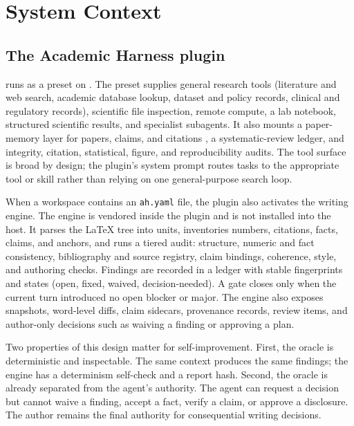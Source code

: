 \section{System Context}
\label{sec:context}

\subsection{The Academic Harness plugin}
\ah{} runs as a preset on \dsh{} \citep{academicharness2026,deepseek2026harness}. The preset supplies general research tools (literature and web search, academic database lookup, dataset and policy records, clinical and regulatory records), scientific file inspection, remote compute, a lab notebook, structured scientific results, and specialist subagents. It also mounts a paper-memory layer for papers, claims, and citations \citep{papermemory2026}, a systematic-review ledger, and integrity, citation, statistical, figure, and reproducibility audits. The tool surface is broad by design; the plugin's system prompt routes tasks to the appropriate tool or skill rather than relying on one general-purpose search loop.

When a workspace contains an \texttt{ah.yaml} file, the plugin also activates the \ah{} writing engine. The engine is vendored inside the plugin and is not installed into the host. It parses the \LaTeX{} tree into units, inventories numbers, citations, facts, claims, and anchors, and runs a tiered audit: structure, numeric and fact consistency, bibliography and source registry, claim bindings, coherence, style, and authoring checks. Findings are recorded in a ledger with stable fingerprints and states (open, fixed, waived, decision-needed). A gate closes only when the current turn introduced no open blocker or major. The engine also exposes snapshots, word-level diffs, claim sidecars, provenance records, review items, and author-only decisions such as waiving a finding or approving a plan.

Two properties of this design matter for self-improvement. First, the oracle is deterministic and inspectable. The same context produces the same findings; the engine has a determinism self-check and a report hash. Second, the oracle is already separated from the agent's authority. The agent can request a decision but cannot waive a finding, accept a fact, verify a claim, or approve a disclosure. The author remains the final authority for consequential writing decisions.

